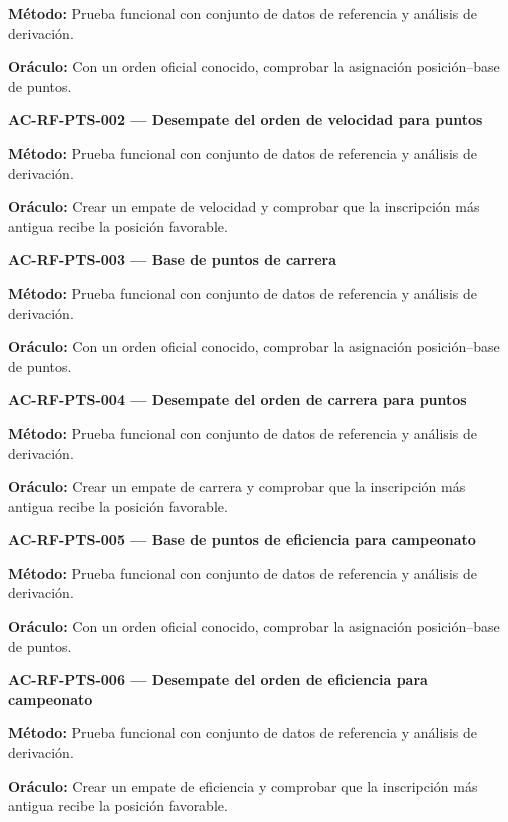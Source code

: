 \documentclass[10pt,letterpaper]{article}
\begin{document}
\textbf{Método:} Prueba funcional con conjunto de datos de referencia y análisis de derivación.\par
\textbf{Oráculo:} Con un orden oficial conocido, comprobar la asignación posición--base de puntos.\par\vspace{0.45em}
\noindent\textbf{AC-RF-PTS-002 --- Desempate del orden de velocidad para puntos}\par
\textbf{Método:} Prueba funcional con conjunto de datos de referencia y análisis de derivación.\par
\textbf{Oráculo:} Crear un empate de velocidad y comprobar que la inscripción más antigua recibe la posición favorable.\par\vspace{0.45em}
\noindent\textbf{AC-RF-PTS-003 --- Base de puntos de carrera}\par
\textbf{Método:} Prueba funcional con conjunto de datos de referencia y análisis de derivación.\par
\textbf{Oráculo:} Con un orden oficial conocido, comprobar la asignación posición--base de puntos.\par\vspace{0.45em}
\noindent\textbf{AC-RF-PTS-004 --- Desempate del orden de carrera para puntos}\par
\textbf{Método:} Prueba funcional con conjunto de datos de referencia y análisis de derivación.\par
\textbf{Oráculo:} Crear un empate de carrera y comprobar que la inscripción más antigua recibe la posición favorable.\par\vspace{0.45em}
\noindent\textbf{AC-RF-PTS-005 --- Base de puntos de eficiencia para campeonato}\par
\textbf{Método:} Prueba funcional con conjunto de datos de referencia y análisis de derivación.\par
\textbf{Oráculo:} Con un orden oficial conocido, comprobar la asignación posición--base de puntos.\par\vspace{0.45em}
\noindent\textbf{AC-RF-PTS-006 --- Desempate del orden de eficiencia para campeonato}\par
\textbf{Método:} Prueba funcional con conjunto de datos de referencia y análisis de derivación.\par
\textbf{Oráculo:} Crear un empate de eficiencia y comprobar que la inscripción más antigua recibe la posición favorable.\par\vspace{0.45em}
\end{document}
